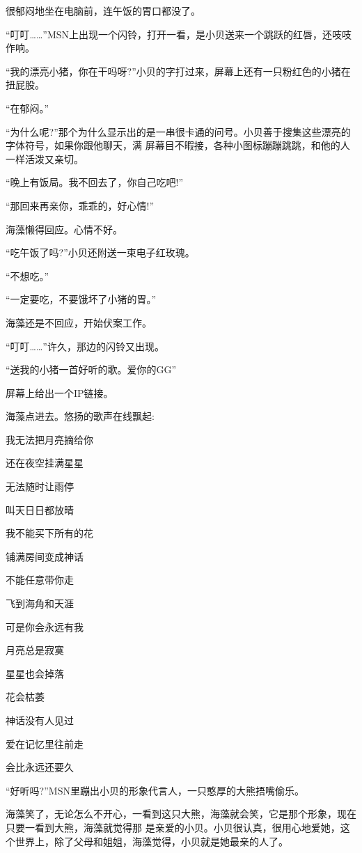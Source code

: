 \documentclass[11pt,a4paper,onecolumn]{article}
\begin{document}
很郁闷地坐在电脑前，连午饭的胃口都没了。

``叮叮……''MSN上出现一个闪铃，打开一看，是小贝送来一个跳跃的红唇，还吱吱作响。

``我的漂亮小猪，你在干吗呀?''小贝的字打过来，屏幕上还有一只粉红色的小猪在扭屁股。

``在郁闷。''

``为什么呢?''那个为什么显示出的是一串很卡通的问号。小贝善于搜集这些漂亮的字体符号，如果你跟他聊天，满
屏幕目不暇接，各种小图标蹦蹦跳跳，和他的人一样活泼又亲切。

``晚上有饭局。我不回去了，你自己吃吧!''

``那回来再亲你，乖乖的，好心情!''

海藻懒得回应。心情不好。

``吃午饭了吗?''小贝还附送一束电子红玫瑰。

``不想吃。''

``一定要吃，不要饿坏了小猪的胃。''

海藻还是不回应，开始伏案工作。

``叮叮……''许久，那边的闪铃又出现。

``送我的小猪一首好听的歌。爱你的GG''

屏幕上给出一个IP链接。

海藻点进去。悠扬的歌声在线飘起:

\begin{center} {\sffamily

我无法把月亮摘给你

还在夜空挂满星星

无法随时让雨停

叫天日日都放晴

我不能买下所有的花

铺满房间变成神话

不能任意带你走

飞到海角和天涯

可是你会永远有我

月亮总是寂寞

星星也会掉落

花会枯萎

神话没有人见过

爱在记忆里往前走

会比永远还要久}
\end{center}

``好听吗?''MSN里蹦出小贝的形象代言人，一只憨厚的大熊捂嘴偷乐。

海藻笑了，无论怎么不开心，一看到这只大熊，海藻就会笑，它是那个形象，现在只要一看到大熊，海藻就觉得那
是亲爱的小贝。小贝很认真，很用心地爱她，这个世界上，除了父母和姐姐，海藻觉得，小贝就是她最亲的人了。
\end{document}
